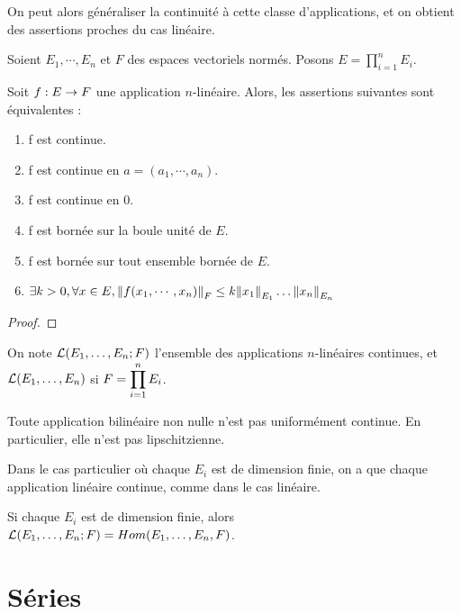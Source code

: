 On peut alors généraliser la continuité à cette classe d'applications, et on
obtient des assertions proches du cas linéaire.

\begin{proposition}
	Soient $E_{1}, \cdots, E_{n}$ et $F$ des espaces vectoriels normés. Posons
	$E = \displaystyle \prod_{i = 1}^{n} E_{i}$.

	Soit $f : E \rightarrow F$ une application $n$-linéaire.
	Alors, les assertions suivantes sont équivalentes :

	\begin{enumerate}
		\item f est continue.
		\item f est continue en $a = (a_{1}, \cdots, a_{n})$.
		\item f est continue en $0$.
		\item f est bornée sur la boule unité de $E$.
		\item f est bornée sur tout ensemble bornée de $E$.
		\item $\exists k > 0, \forall x \in E, \norm{f(x_{1}, \cdots,
			x_{n})}_{F} \leq k \norm{x_{1}}_{E_{1}} \ldots
			\norm{x_{n}}_{E_{n}}$
	\end{enumerate}
\end{proposition}

\ifdefined\outputproof
\begin{proof}

\end{proof}
\fi

On note $\mathcal{L}(E_{1}, \ldots, E_{n}; F)$ l'ensemble des applications
$n$-linéaires continues, et $\mathcal{L}(E_{1}, \ldots, E_{n})$ si $F =
\displaystyle \prod_{i = 1}^{n} E_{i}$.

\begin{remarque}
	Toute application bilinéaire non nulle n'est pas uniformément continue. En
	particulier, elle n'est pas lipschitzienne.
\end{remarque}

Dans le cas particulier où chaque $E_{i}$ est de dimension finie, on a que
chaque application linéaire continue, comme dans le cas linéaire.

\begin{proposition}
	Si chaque $E_{i}$ est de dimension finie, alors $\mathcal{L}(E_{1},
	\ldots, E_{n}; F) = Hom(E_{1}, \ldots, E_{n}, F)$.
\end{proposition}

\section{Séries}

